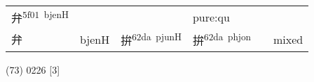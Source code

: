 \documentclass[14pt,a4paper]{scrartcl}
\begin{document}
\begin{longtable}[c]{@{}llllll@{}}
\begin{minipage}[t]{0.14\columnwidth}
弁\textsuperscript{5f01~bjenH}
\strut\end{minipage} &
\begin{minipage}[t]{0.14\columnwidth}\raggedright\strut
\strut\end{minipage} &
\begin{minipage}[t]{0.14\columnwidth}\raggedright\strut
\strut\end{minipage} &
\begin{minipage}[t]{0.14\columnwidth}\raggedright\strut
pure:qu
\strut\end{minipage}\tabularnewline
\begin{minipage}[t]{0.14\columnwidth}\raggedright\strut
弁
\strut\end{minipage} &
\begin{minipage}[t]{0.14\columnwidth}\raggedright\strut
bjenH
\strut\end{minipage} &
\begin{minipage}[t]{0.14\columnwidth}\raggedright\strut
拚\textsuperscript{62da~pjunH}
\strut\end{minipage} &
\begin{minipage}[t]{0.14\columnwidth}\raggedright\strut
拚\textsuperscript{62da~phjon}
\strut\end{minipage} &
\begin{minipage}[t]{0.14\columnwidth}\raggedright\strut
\strut\end{minipage} &
\begin{minipage}[t]{0.14\columnwidth}\raggedright\strut
mixed
\strut\end{minipage}\tabularnewline
\bottomrule
\end{longtable}

(73) 0226 {[}3{]}
\end{document}

